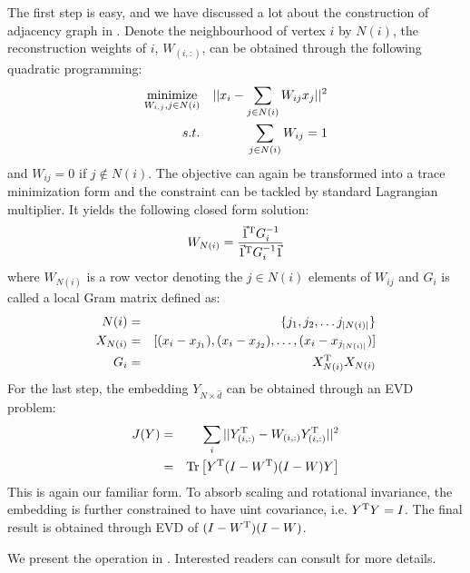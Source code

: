 The first step is easy, and we have discussed a lot about 
the construction of adjacency graph in \rsec{\ref{sec:metric}}. 
Denote the neighbourhood of vertex $ i $ by $ N(i) $, the 
reconstruction weights of $ i $, $ W_{(i,:)} $, can be 
obtained through the following quadratic programming:
\begin{eqnarray}
	\operatorname*{minimize}_{ W_{i,j}, j \in N(i) } && {||x_i - \sum_{j \in N(i)}{W_{ij}x_j}||^2} \\
	s.t. && \sum_{j \in N(i)} W_{ij} = 1 
\end{eqnarray}
and $ W_{ij} = 0 $ if $ j \notin N(i) $. 
The objective can again be transformed into a trace minimization form
and the constraint can be tackled by standard Lagrangian multiplier.
It yields the following closed form solution:
\begin{equation}
	W_{N(i)} = \frac{\vec{1}^\mathrm{T} G_i^{-1}}{\vec{1}^\mathrm{T} G_i^{-1} \vec{1}}
\end{equation}
where $ W_{N(i)} $ is a row vector denoting
the $ j \in N(i) $ elements of $ W_{ij} $ and 
$ G_i $ is called a local Gram matrix defined as:
\begin{eqnarray}
	N(i) &=& \{ j_1,j_2, \ldots j_{|N(i)|}\} \\
	X_{N(i)} &=& [(x_i - x_{j_1}), (x_i - x_{j_2}), \ldots, (x_i - x_{j_{|N(i)|}}) ] \\
	G_i &=& X_{N(i)} ^\mathrm{T} X_{N(i)}
\end{eqnarray}
For the last step, the embedding $ Y_{N \times \hat{d}} $ can be obtained 
through an EVD problem:
\begin{eqnarray}
	J(Y) &=& \sum_{i}||Y_{(i,:)}^\mathrm{T} - W_{(i,:)}Y_{(i,:)}^\mathrm{T}||^2 \\
	&=& \mathrm{Tr}\left[ Y^\mathrm{T} (I - W^\mathrm{T})(I - W) Y \right]
\end{eqnarray}
This is again our familiar form. To absorb scaling and rotational invariance, 
the embedding is further constrained to have uint covariance, i.e.
$ Y^\mathrm{T} Y = I $. The final result is obtained through EVD of 
$ (I - W^\mathrm{T})(I - W) $. 

We present the operation in \ralg{\ref{alg:lle}}. 
Interested readers can consult \cite{saul2003think} 
for more details. 

